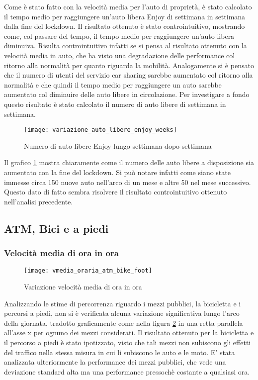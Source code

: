 
Come è stato fatto con la velocità media per l'auto di proprietà, è stato calcolato il tempo medio per raggiungere un'auto libera Enjoy di settimana in settimana dalla fine del lockdown. Il risultato ottenuto è stato controintuitivo, mostrando come, col passare del tempo, il tempo medio per raggiungere un'auto libera diminuiva. Risulta controintuitivo infatti se si pensa al risultato ottenuto con la velocità media in auto, che ha visto una degradazione delle performance col ritorno alla normalità per quanto riguarda la mobilità. Analogamente si è pensato che il numero di utenti del servizio car sharing sarebbe aumentato col ritorno alla normalità e che quindi il tempo medio per raggiungere un auto sarebbe aumentato col diminuire delle auto libere in circolazione. Per investigare a fondo questo risultato è stato calcolato il numero di auto libere di settimana in settimana.

\begin{figure}[H]
	\texttt{[image: variazione\_auto\_libere\_enjoy\_weeks]}
	\caption{Numero di auto libere Enjoy lungo settimana dopo settimana}
	\label{image:7}
\end{figure}

Il grafico \ref{image:7} mostra chiaramente come il numero delle auto libere a disposizione sia aumentato con la fine del lockdown. Si può notare infatti come siano state immesse circa 150 nuove auto nell'arco di un mese e altre 50 nel mese successivo. Questo dato di fatto sembra risolvere il risultato controintuitivo ottenuto nell'analisi precedente.


\subsection{ATM, Bici e a piedi}

\subsubsection{Velocità media di ora in ora}

\begin{figure}[H]
	\texttt{[image: vmedia\_oraria\_atm\_bike\_foot]}
	\caption{Variazione velocità media di ora in ora}
	\label{image:8}
\end{figure}

Analizzando le stime di percorrenza riguardo i mezzi pubblici, la bicicletta e i percorsi a piedi, non si è verificata alcuna variazione significativa lungo l'arco della giornata, tradotto graficamente come nella figura \ref{image:8} in una retta parallela all'asse x per ognuno dei mezzi considerati. Il risultato ottenuto per la bicicletta e il percorso a piedi è stato ipotizzato, visto che tali mezzi non subiscono gli effetti del traffico nella stessa misura in cui li subiscono le auto e le moto. E' stata analizzata ulteriormente la performance dei mezzi pubblici, che vede una deviazione standard alta ma una performance pressochè costante a qualsiasi ora.

